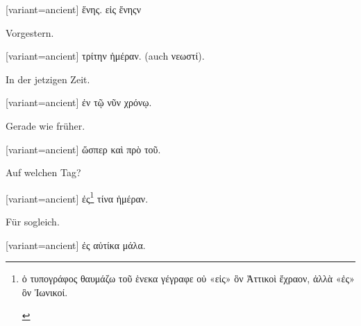 \switchcolumn

\begin{greek}[variant=ancient]%
ἕνης. εἰς ἕνηςν

\end{greek}%
\switchcolumn*

Vorgestern.

\switchcolumn

\begin{greek}[variant=ancient]%
τρίτην ἡμέραν. (\textgerman[spelling=old,babelshorthands=true]{auch}
νεωστί).

\end{greek}%
\indent In der jetzigen Zeit.

\switchcolumn

\begin{greek}[variant=ancient]%
ἐν τῷ νῦν χρόνῳ.

\end{greek}%
\switchcolumn*

Gerade wie früher.

\switchcolumn

\begin{greek}[variant=ancient]%
ὥσπερ καὶ πρὸ τοῦ.

\end{greek}%
\switchcolumn*

Auf welchen Tag?

\switchcolumn

\begin{greek}[variant=ancient]%
ἐς\footnote{\begin{latin}%
\textgreek[variant=ancient]{ὁ τυπογράφος θαυμάζω τοῦ ἑνεκα γέγραφε
οὐ «εἰς» ὃν Ἀττικοὶ ἔχραον, ἀλλὰ «ἐς» ὃν Ἰωνικοί.}\end{latin}%
} τίνα ἡμέραν.

\end{greek}%
\switchcolumn*

Für sogleich.

\switchcolumn

\begin{greek}[variant=ancient]%
ἐς αὐτίκα μάλα.

\end{greek}%
\switchcolumn*

